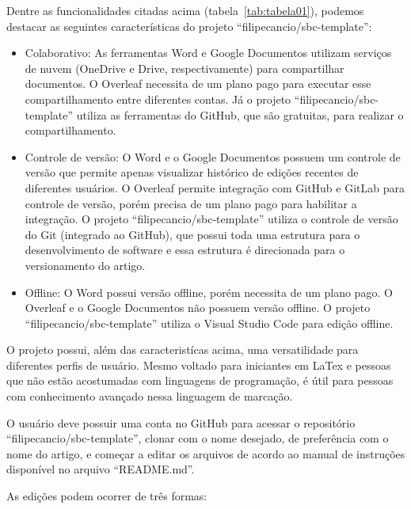 Dentre as funcionalidades citadas acima (tabela~\ref{tab:tabela01}), podemos destacar as seguintes características do projeto ``filipecancio/sbc-template'':

\begin{itemize}
	\item Colaborativo: As ferramentas Word e Google Documentos utilizam serviços de nuvem (OneDrive e Drive, respectivamente) para compartilhar documentos. O Overleaf necessita de um plano pago para executar esse compartilhamento entre diferentes contas. Já o projeto ``filipecancio/sbc-template'' utiliza as ferramentas do GitHub, que são gratuitas, para realizar o compartilhamento.
	\item Controle de versão: O Word e o Google Documentos possuem um controle de versão que permite apenas visualizar histórico de edições recentes de diferentes usuários. O Overleaf permite integração com GitHub e GitLab para controle de versão, porém precisa de um plano pago para habilitar a integração. O projeto ``filipecancio/sbc-template'' utiliza o controle de versão do Git (integrado ao GitHub), que possui toda uma estrutura para o desenvolvimento de software e essa estrutura é direcionada para o versionamento do artigo.
	\item Offline: O Word possui versão offline, porém necessita de um plano pago. O Overleaf e o Google Documentos não possuem versão offline. O projeto ``filipecancio/sbc-template'' utiliza o Visual Studio Code para edição offline.
\end{itemize}

O projeto possui, além das caracteristícas acima, uma versatilidade para diferentes perfis de usuário. Mesmo voltado para iniciantes em LaTex e pessoas que não estão acostumadas com linguagens de programação, é útil para pessoas com conhecimento avançado nessa linguagem de marcação. 

O usuário deve possuir uma conta no GitHub para acessar o repositório ``filipecancio/sbc-template'', clonar com o nome desejado, de preferência com o nome do artigo, e começar a editar os arquivos de acordo ao manual de instruções disponível no arquivo ``README.md''.

As edições podem ocorrer de três formas:


